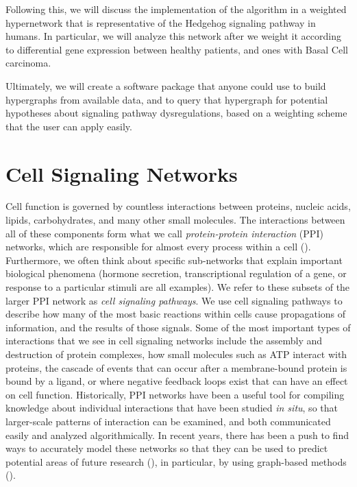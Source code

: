 \documentclass[12pt,twoside]{reedthesis}
\theoremstyle{definition}
\begin{document}
 Following this, we will discuss the implementation of the algorithm in a weighted hypernetwork that is representative of the Hedgehog signaling pathway in humans. In particular, we will analyze this network after we weight it according to differential gene expression between healthy patients, and ones with Basal Cell carcinoma.

 Ultimately, we will create a software package that anyone could use to build hypergraphs from available data, and to query that hypergraph for potential hypotheses about signaling pathway dysregulations, based on a weighting scheme that the user can apply easily.\par

\chapter{Cell Signaling Networks}

Cell function is governed by countless interactions between proteins, nucleic acids, lipids, carbohydrates, and many other small molecules.  The interactions between all of these components form what we call \textit{protein-protein interaction} (PPI) networks, which are responsible for almost every process within a cell (\cite{Taylor2009}). Furthermore, we often think about specific sub-networks that explain important biological phenomena (hormone secretion, transcriptional regulation of a gene, or response to a particular stimuli are all examples). We refer to these subsets of the larger PPI network as \textit{cell signaling pathways}. We use cell signaling pathways to describe how many of the most basic reactions within cells cause propagations of information, and the results of those signals.  Some of the most important types of interactions that we see in cell signaling networks include the assembly and destruction of protein complexes, how small molecules such as ATP interact with proteins, the cascade of events that can occur after a membrane-bound protein is bound by a ligand, or where negative feedback loops exist that can have an effect on cell function.  Historically, PPI networks have been a useful tool for compiling knowledge about individual interactions that have been studied \textit{in situ}, so that larger-scale patterns of interaction can be examined, and both communicated easily and analyzed algorithmically. In recent years, there has been a push to find ways to accurately model these networks so that they can be used to predict potential areas of future research (\cite{Haverty2004}), in particular, by using graph-based methods (\cite{Aittokallio2006}).\par
\end{document}
